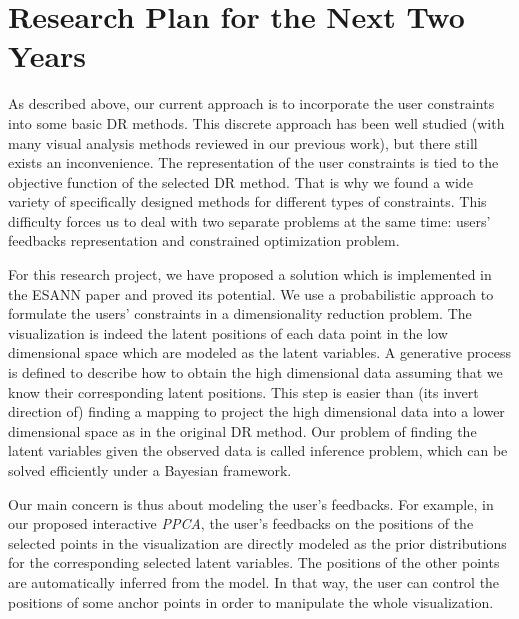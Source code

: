 \documentclass[11pt, a4paper]{article}
\begin{document}
\section{Research Plan for the Next Two Years}\label{sec:work}
As described above, our current approach is to incorporate the user constraints into some basic DR methods.
This discrete approach has been well studied (with many visual analysis methods reviewed in our previous work), but there still exists an inconvenience.
The representation of the user constraints is tied to the objective function of the selected DR method.
That is why we found a wide variety of specifically designed methods for different types of constraints.
This difficulty forces us to deal with two separate problems at the same time: users' feedbacks representation and constrained optimization problem.

For this research project, we have proposed a solution which is implemented in the ESANN paper and proved its potential.
We use a probabilistic approach to formulate the users' constraints in a dimensionality reduction problem.
The visualization is indeed the latent positions of each data point in the low dimensional space which are modeled as the latent variables.
A generative process is defined to describe how to obtain the high dimensional data assuming that we know their corresponding latent positions.
This step is easier than (its invert direction of) finding a mapping to project the high dimensional data into a lower dimensional space as in the original DR method.
Our problem of finding the latent variables given the observed data is called inference problem, which can be solved efficiently under a Bayesian framework.

Our main concern is thus about modeling the user's feedbacks.
For example, in our proposed interactive \emph{PPCA}, the user's feedbacks on the positions of the selected points in the visualization are directly modeled as the prior distributions for the corresponding selected latent variables.
The positions of the other points are automatically inferred from the model.
In that way, the user can control the positions of some anchor points in order to manipulate the whole visualization.
\end{document}

